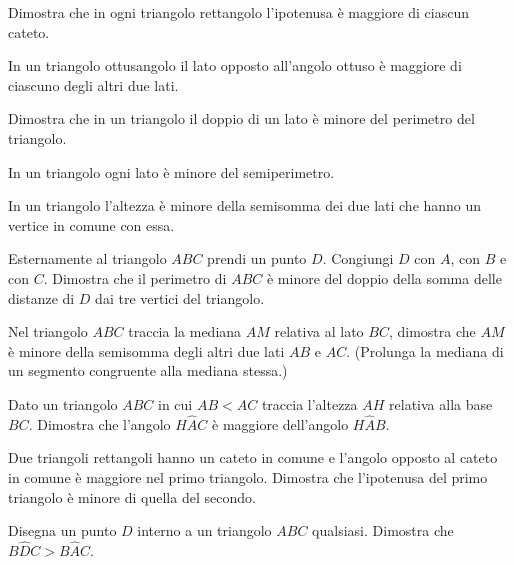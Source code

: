 \begin{multicols}{2}

\begin{esercizio}
\label{ese:3.84}
Dimostra che in ogni triangolo rettangolo l'ipotenusa è maggiore di 
ciascun cateto.
\end{esercizio}

\begin{esercizio}
\label{ese:3.86}
In un triangolo ottusangolo il lato opposto all'angolo ottuso è 
maggiore di ciascuno degli altri due lati.
\end{esercizio}

\begin{esercizio}
\label{ese:3.87}
Dimostra che in un triangolo il doppio di un lato è minore del 
perimetro del triangolo. 
\end{esercizio}

\begin{esercizio}
\label{ese:3.92}
In un triangolo ogni lato è minore del semiperimetro.
\end{esercizio}

\begin{esercizio}
\label{ese:3.93}
In un triangolo l'altezza è minore della semisomma dei due lati che 
hanno un vertice in comune con essa.
\end{esercizio}

\begin{esercizio}
\label{ese:3.98}
Esternamente al triangolo $ABC$ prendi un punto $D$. Congiungi $D$ 
con $A$, con $B$ e con $C$. Dimostra che il perimetro di $ABC$ è 
minore del doppio della somma delle distanze di $D$ dai tre vertici 
del triangolo.
\end{esercizio}

\begin{esercizio}
\label{ese:3.99}
Nel triangolo $ABC$ traccia la mediana $AM$ relativa al lato $BC$, 
dimostra che $AM$ è minore della semisomma degli altri due lati $AB$ 
e $AC$. (Prolunga la mediana di un segmento congruente alla mediana 
stessa.)
\end{esercizio}

\begin{esercizio}
\label{ese:3.102}
Dato un triangolo $ABC$ in cui $AB<AC$ traccia l'altezza $AH$ 
relativa alla base $BC$. Dimostra che l'angolo $H\widehat{A}C$ è 
maggiore dell'angolo $H\widehat{A}B$.
\end{esercizio}

\begin{esercizio}
\label{ese:3.106}
Due triangoli rettangoli hanno un cateto in comune e l'angolo opposto 
al cateto in comune è maggiore nel primo triangolo. Dimostra che 
l'ipotenusa del primo triangolo è minore di quella del secondo.
\end{esercizio}

\begin{esercizio}
\label{ese:3.109}
Disegna un punto $D$ interno a un triangolo $ABC$ qualsiasi. Dimostra 
che $B\widehat{D}C>B\widehat{A}C$.
\end{esercizio}

\end{multicols}

